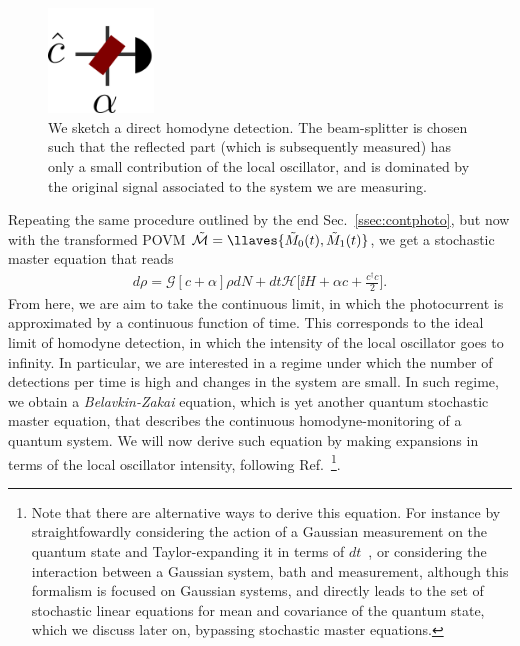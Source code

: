 \begin{figure}[t!]
    \centering
    \includegraphics[width=0.25\textwidth]{Figures/CMON/INTRO/homodyne.png}
    \caption{We sketch a direct homodyne detection. The beam-splitter is chosen such that the reflected part (which is subsequently measured) has only a small contribution of the local oscillator, and is dominated by the original signal associated to the system we are measuring.}
    \label{fig:direhom}
\end{figure}

Repeating the same procedure outlined by the end Sec.~\ref{ssec:contphoto}, but now with the transformed POVM $\tilde{\mathcal{M}} = \llaves{\tilde{M}_0(t), \tilde{M}_1(t)}$, we get a stochastic master equation that reads
\begin{align}
d\rho = \mathcal{G}[c+\alpha] \rho dN + dt \mathcal{H}\Big[\ii H + \alpha c + \frac{c^\dagger c}{2}\Big].
\end{align}
From here, we are aim to take the continuous limit, in which the photocurrent is approximated by a continuous function of time. This corresponds to the ideal limit of homodyne detection, in which the intensity of the local oscillator goes to infinity. In particular, we are interested in a regime under which the number of detections per time is high and changes in the system are small. In such regime, we obtain a \textit{Belavkin-Zakai} equation, which is yet another quantum stochastic master equation, that describes the continuous homodyne-monitoring of a quantum system. We will now derive such equation by making expansions in terms of the local oscillator intensity, following Ref.~\cite{wisemanbook}\footnote{Note that there are alternative ways to derive this equation. For instance by straightfowardly considering the action of a Gaussian measurement on the quantum state and Taylor-expanding it in terms of $dt$~\cite{jacobs_2014, JacobsStraightfoward2006}, or considering the interaction between a Gaussian system, bath and measurement\cite{serafini2017quantum,Genoni2016conditional}, although this formalism is focused on Gaussian systems, and directly leads to the set of stochastic linear equations for mean and covariance of the quantum state, which we discuss later on, bypassing stochastic master equations.}.

